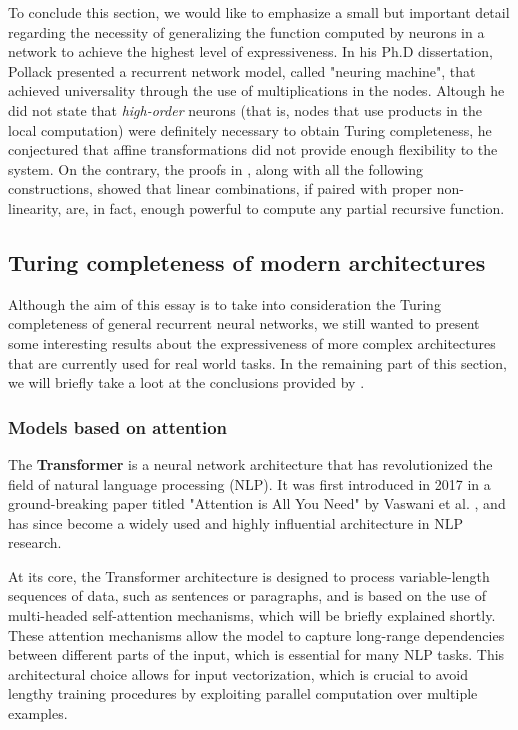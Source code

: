\documentclass{article}
\begin{document}
To conclude this section, we would like to emphasize a small but important detail regarding the necessity of generalizing the function computed by neurons in a network to achieve the highest level of expressiveness. In his Ph.D dissertation, Pollack \cite{POL87} presented a recurrent network model, called "neuring machine", that achieved universality through the use of multiplications in the nodes. Altough he did not state that \textit{high-order} neurons (that is, nodes that use products in the local computation) were definitely necessary to obtain Turing completeness, he conjectured that affine transformations did not provide enough flexibility to the system. On the contrary, the proofs in \cite{SIE95}, along with all the following constructions, showed that linear combinations, if paired with proper non-linearity, are, in fact, enough powerful to compute any partial recursive function.

\subsection{Turing completeness of modern architectures}

Although the aim of this essay is to take into consideration the Turing completeness of general recurrent neural networks, we still wanted to present some interesting results about the expressiveness of more complex architectures that are currently used for real world tasks. In the remaining part of this section, we will briefly take a loot at the conclusions provided by \cite{PER19}.

\subsubsection{Models based on attention}
The \textbf{Transformer} is a neural network architecture that has revolutionized the field of natural language processing (NLP). It was first introduced in 2017 in a ground-breaking paper titled "Attention is All You Need" by Vaswani et al. \cite{VAS17}, and has since become a widely used and highly influential architecture in NLP research.

At its core, the Transformer architecture is designed to process variable-length sequences of data, such as sentences or paragraphs, and is based on the use of multi-headed self-attention mechanisms, which will be briefly explained shortly. These attention mechanisms allow the model to capture long-range dependencies between different parts of the input, which is essential for many NLP tasks. This architectural choice allows for input vectorization, which is crucial to avoid lengthy training procedures by exploiting parallel computation over multiple examples.
\end{document}
